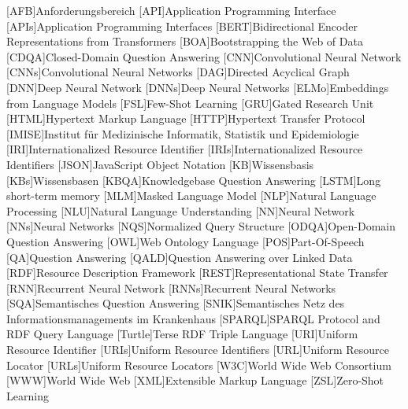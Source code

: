 \begin{acronym}[nogroupskip]
\setlength{\parskip}{0ex}
\setlength{\itemsep}{1.5ex}
[AFB]{Anforderungsbereich}
[API]{Application Programming Interface}
[APIs]{Application Programming Interfaces}
[BERT]{Bidirectional Encoder Representations from Transformers}
[BOA]{Bootstrapping the Web of Data}
[CDQA]{Closed-Domain Question Answering}
[CNN]{Convolutional Neural Network}
[CNNs]{Convolutional Neural Networks}
[DAG]{Directed Acyclical Graph}
[DNN]{Deep Neural Network}
[DNNs]{Deep Neural Networks}
[ELMo]{Embeddings from Language Models}
[FSL]{Few-Shot Learning}
[GRU]{Gated Research Unit}
[HTML]{Hypertext Markup Language}
[HTTP]{Hypertext Transfer Protocol}
[IMISE]{Institut für Medizinische Informatik, Statistik und Epidemiologie}
[IRI]{Internationalized Resource Identifier}
[IRIs]{Internationalized Resource Identifiers}
[JSON]{JavaScript Object Notation}
[KB]{Wissensbasis}
[KBs]{Wissensbasen}
[KBQA]{Knowledgebase Question Answering}
[LSTM]{Long short-term memory}
[MLM]{Masked Language Model}
[NLP]{Natural Language Processing}
[NLU]{Natural Language Understanding}
[NN]{Neural Network}
[NNs]{Neural Networks}
[NQS]{Normalized Query Structure}
[ODQA]{Open-Domain Question Answering}
[OWL]{Web Ontology Language}
[POS]{Part-Of-Speech}
[QA]{Question Answering}
[QALD]{Question Answering over Linked Data}
[RDF]{Resource Description Framework}
[REST]{Representational State Transfer}
[RNN]{Recurrent Neural Network}
[RNNs]{Recurrent Neural Networks}
[SQA]{Semantisches Question Answering}
[SNIK]{Semantisches Netz des Informationsmanagements im Krankenhaus}
[SPARQL]{SPARQL Protocol and RDF Query Language}
[Turtle]{Terse RDF Triple Language}
[URI]{Uniform Resource Identifier}
[URIs]{Uniform Resource Identifiers}
[URL]{Uniform Resource Locator}
[URLs]{Uniform Resource Locators}
[W3C]{World Wide Web Consortium}
[WWW]{World Wide Web}
[XML]{Extensible Markup Language}
[ZSL]{Zero-Shot Learning}
\end{acronym}

